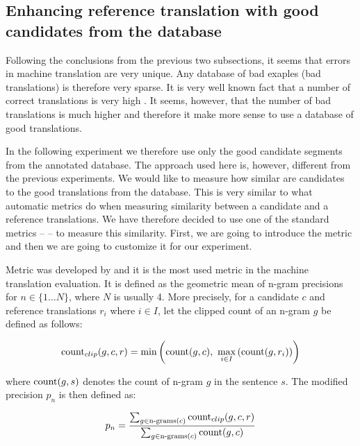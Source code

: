 \subsection{Enhancing reference translation with good candidates from the database}

Following the conclusions from the previous two subsections, it seems that
errors in machine translation are very unique. Any database of bad exaples (bad
translations) is therefore very sparse. It is very well known fact that a
number of correct translations is very high . It
seems, however, that the number of bad translations is much higher and
therefore it make more sense to use a database of good translations. 

In the following experiment we therefore use only the good candidate segments
from the annotated database. The approach used here is, however, different from
the previous experiments. We would like to measure how similar are candidates
to the good translations from the database. This is very similar to what
automatic metrics do when measuring similarity between a candidate and a
reference translations. We have therefore decided to use one of the standard
metrics --  -- to measure this similarity. First, we are going to
introduce the metric and then we are going to customize it for our experiment. 

Metric  was developed by  and it is the
most used metric in the machine translation evaluation. It is defined as the
geometric mean of n-gram precisions for $n \in \{1 \ldots N\}$, where $N$ is
usually 4. More precisely, for a candidate $c$ and reference translations $r_i$
where $i \in I$, let the clipped count of an n-gram $g$ be defined as follows:

\begin{equation*}
    \text{count}_{clip}(g,c,r) = \min \left( \operatorname{count}(g, c), ~ \max_{i \in I} \left( \operatorname{count}(g, r_i) \right) \right)
\end{equation*}

\noindent where $\operatorname{count}(g, s)$ denotes the count of n-gram $g$ in the sentence
$s$. The modified precision $p_n$ is then defined as:

\begin{equation*}
    p_n = \frac{
        \sum_{g \in \text{n-grams}(c)} \text{count}_{clip}(g,c,r)
    }{
        \sum_{g \in \text{n-grams}(c)} \operatorname{count}(g,c)
    }
\end{equation*}

